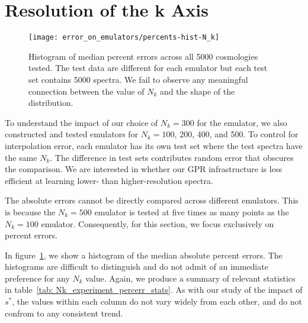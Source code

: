 \section{Resolution of the k Axis}
\label{sec: Nk_experiment}

\begin{figure}[ht!]
  \centering
  \texttt{[image: error\_on\_emulators/percents-hist-N\_k]}
  \caption[Impact of $N_k$ on Accuracy]{Histogram of median percent errors
  	across all 5000 cosmologies tested. The test data are different for each
  	emulator but each test set contains 5000 spectra. We fail to observe any
  	meaningful connection between the value of $N_k$ and the shape of the
  	distribution.}
  \label{fig: Nk_experiment}
\end{figure}

To understand the impact of our choice of $N_k = 300$ for the emulator, we
also constructed and tested emulators for $N_k = 100$, 200, 400, and 500.
To control for interpolation error, each emulator has its own test set where
the test spectra have the same $N_k$. The
difference in test sets contributes random error that obscures the comparison.
We are interested in whether our GPR infrastructure is less efficient at
learning lower- than higher-resolution spectra.

The absolute errors cannot be directly compared across different emulators.
This is because the $N_k = 500$ emulator is tested at five times as many
points as the $N_k = 100$ emulator. Consequently, for this section, we focus
exclusively on percent errors.

In figure~\ref{fig: Nk_experiment}, we show a histogram of the median absolute
percent errors. The histograms are difficult to distinguish and do not admit
of an immediate preference for any $N_k$ value. Again, we produce a summary
of relevant statistics in table~\ref{tab: Nk_experiment_percerr_stats}. As
with our study of the impact of $s^*$, the values within each column do not
vary widely from each other, and do not confrom to any consistent trend.

